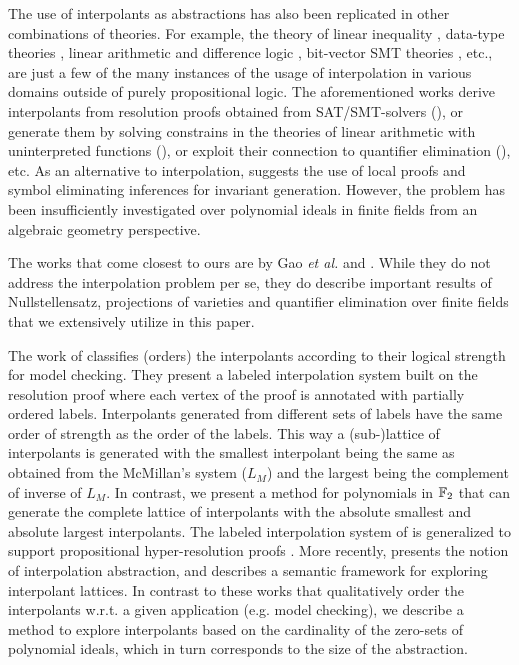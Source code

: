The use of interpolants as abstractions has also been replicated in
other combinations of theories. For example, the theory of linear
inequality \cite{McMillan:TACAS04}, data-type theories
\cite{Kapur:SIGSOFT06}, linear arithmetic and difference logic
\cite{Cimatti:TACAS08}, bit-vector SMT theories
\cite{Griggio:FMCAD11}, etc., are just a few of the many instances
of the usage of interpolation in various domains outside of purely
propositional logic. The aforementioned works derive interpolants from
resolution proofs obtained from SAT/SMT-solvers
(\cite{Cimatti:TACAS08}), or generate them by solving constrains
in the theories of linear arithmetic with uninterpreted functions
(\cite{Rybalchenko:VMCAI-2007}),  or exploit their connection to
quantifier elimination (\cite{Kapur:SIGSOFT06}), etc. As an 
alternative to interpolation, \cite{Kovacs2009} suggests the use of
local proofs and symbol eliminating inferences for invariant
generation.  
However, the problem has been insufficiently investigated over
polynomial ideals in finite fields from an algebraic geometry
perspective. 


The works that come closest to ours are by Gao {\it et al.}
\cite{gao:qe-gf-gb} and \cite{gao:gf-gb-ms}. While they do not
address the interpolation problem per se, they do describe important
results of Nullstellensatz, projections of varieties and quantifier
elimination over finite fields that we extensively utilize in this
paper.  

The work of \cite{dsilva:vmcai2010} classifies (orders) the
interpolants according to their logical strength for model 
checking. They present a labeled interpolation system built on the
resolution proof where each vertex of the proof is annotated with
partially ordered labels.  Interpolants generated from different sets
of labels have the same  order of strength as the order of the labels.
This way a (sub-)lattice of interpolants is generated with the
smallest interpolant being the same as obtained from the McMillan's
system ($L_M$) \cite{McMillan:CAV03} and the largest being the
complement of inverse of $L_M$. In contrast, we present a method for
polynomials in ${\mathbb{F}}_2$ that can generate the complete lattice of
interpolants with the absolute smallest and   absolute largest
interpolants. The labeled interpolation system of
\cite{dsilva:vmcai2010} is generalized  to support  propositional
hyper-resolution proofs \cite{Weissenbacher2012}. 
More recently, \cite{rummer:fmcad2013} presents the notion of
interpolation abstraction, and describes a semantic framework for
exploring interpolant lattices. In contrast to these works that
qualitatively order the interpolants w.r.t. a given application
(e.g. model checking),  we describe a method to explore interpolants
based on the cardinality of the zero-sets of polynomial ideals, which
in turn corresponds to the size of the abstraction.  

